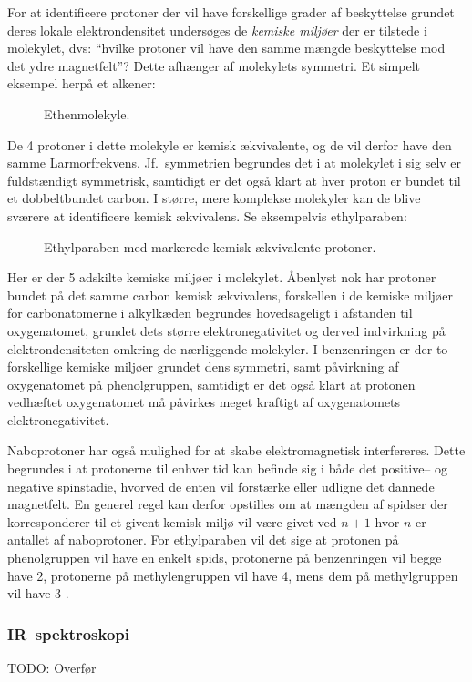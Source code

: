     For at identificere protoner der vil have forskellige grader af beskyttelse grundet deres lokale elektrondensitet undersøges de \textit{kemiske miljøer} der er tilstede i molekylet, dvs: ``hvilke protoner vil have den samme mængde beskyttelse mod det ydre magnetfelt''? Dette afhænger af molekylets symmetri. Et simpelt eksempel herpå et alkener:
    \begin{figure}[H]\centering
        \caption{Ethenmolekyle.}
    \end{figure}
    De 4 protoner i dette molekyle er kemisk ækvivalente, og de vil derfor have den samme Larmorfrekvens. Jf.\ symmetrien begrundes det i at molekylet i sig selv er fuldstændigt symmetrisk, samtidigt er det også klart at hver proton er bundet til et dobbeltbundet carbon. I større, mere komplekse molekyler kan de blive sværere at identificere kemisk ækvivalens. Se eksempelvis ethylparaben:
    \begin{figure}[H]\centering
        \caption{Ethylparaben med markerede kemisk ækvivalente protoner.}
    \end{figure}
    Her er der 5 adskilte kemiske miljøer i molekylet. Åbenlyst nok har protoner bundet på det samme carbon kemisk ækvivalens, forskellen i de kemiske miljøer for carbonatomerne i alkylkæden begrundes hovedsageligt i afstanden til oxygenatomet, grundet dets større elektronegativitet og derved indvirkning på elektrondensiteten omkring de nærliggende molekyler. I benzenringen er der to forskellige kemiske miljøer grundet dens symmetri, samt påvirkning af oxygenatomet på phenolgruppen, samtidigt er det også klart at protonen vedhæftet oxygenatomet må påvirkes meget kraftigt af oxygenatomets elektronegativitet. 

    Naboprotoner har også mulighed for at skabe elektromagnetisk interfereres. Dette begrundes i at protonerne til enhver tid kan befinde sig i både det positive-- og negative spinstadie, hvorved de enten vil forstærke eller udligne det dannede magnetfelt. En generel regel kan derfor opstilles om at mængden af spidser der korresponderer til et givent kemisk miljø vil være givet ved $n+1$ hvor  $n$ er antallet af naboprotoner. For ethylparaben vil det sige at protonen på phenolgruppen vil have en enkelt spids, protonerne på benzenringen vil begge have 2, protonerne på methylengruppen vil have 4, mens dem på methylgruppen vil have 3 \parencite{Nana2020}.

    \subsubsection{IR--spektroskopi}
    TODO: Overfør
